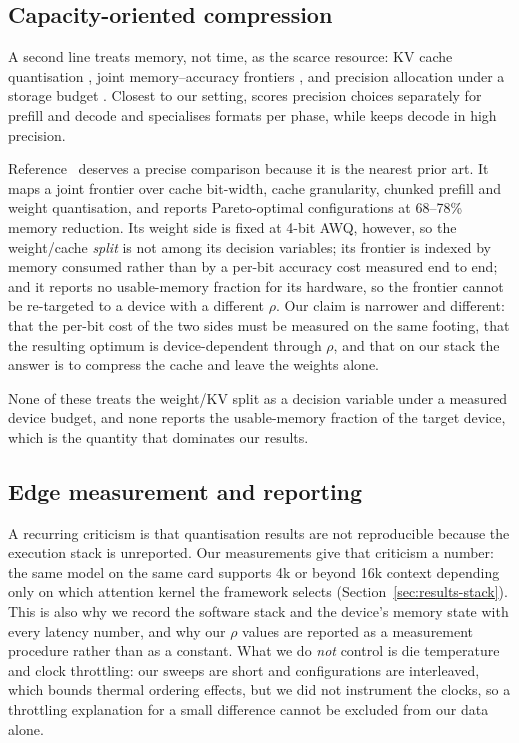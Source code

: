 \documentclass[5p]{elsarticle}
\newcommand{\rhoSym}{\rho}
\begin{document}
\subsection{Capacity-oriented compression}
A second line treats memory, not time, as the scarce resource: KV cache
quantisation \cite{kivi,kvquant,mixkvq}, joint memory--accuracy frontiers
\cite{kvpareto}, and precision allocation under a storage budget
\cite{hawqv2,mixllm,gamma}. Closest to our setting, \cite{alignquant} scores
precision choices separately for prefill and decode and \cite{dq} specialises
formats per phase, while \cite{mixquant} keeps decode in high precision.

Reference~\cite{kvpareto} deserves a precise comparison because it is the nearest prior
art. It maps a joint frontier over cache bit-width, cache granularity, chunked
prefill and weight quantisation, and reports Pareto-optimal configurations at
68--78\% memory reduction. Its weight side is fixed at 4-bit AWQ, however, so the
weight/cache \emph{split} is not among its decision variables; its frontier is
indexed by memory consumed rather than by a per-bit accuracy cost measured end to
end; and it reports no usable-memory fraction for its hardware, so the frontier
cannot be re-targeted to a device with a different $\rhoSym$. Our claim is
narrower and different: that the per-bit cost of the two sides must be measured
on the same footing, that the resulting optimum is device-dependent through
$\rhoSym$, and that on our stack the answer is to compress the cache and leave
the weights alone.

None of these treats the weight/KV split as a decision variable under a measured
device budget, and none reports the usable-memory fraction of the target device,
which is the quantity that dominates our results.

\subsection{Edge measurement and reporting}
A recurring criticism is that quantisation results are not reproducible because
the execution stack is unreported. Our measurements give that criticism a
number: the same model on the same card supports 4k or beyond 16k context
depending only on which attention kernel the framework selects
(Section~\ref{sec:results-stack}). This is also why we record the software stack
and the device's memory state with every latency number, and why our $\rhoSym$
values are reported as a measurement procedure rather than as a constant. What we
do \emph{not} control is die temperature and clock throttling: our sweeps are
short and configurations are interleaved, which bounds thermal ordering effects,
but we did not instrument the clocks, so a throttling explanation for a small
difference cannot be excluded from our data alone.
\end{document}
